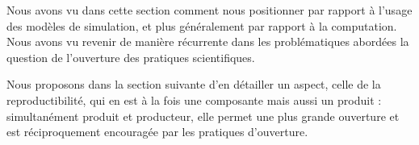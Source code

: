 \stars


Nous avons vu dans cette section comment nous positionner par rapport à l'usage des modèles de simulation, et plus généralement par rapport à la computation. Nous avons vu revenir de manière récurrente dans les problématiques abordées la question de l'ouverture des pratiques scientifiques.

Nous proposons dans la section suivante d'en détailler un aspect, celle de la reproductibilité, qui en est à la fois une composante mais aussi un produit : simultanément produit et producteur, elle permet une plus grande ouverture et est réciproquement encouragée par les pratiques d'ouverture.



\stars


